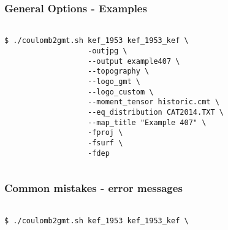 \begin{frame}[t,fragile]
  \frametitle{General Options - Examples}
  \framesubtitle{}
  \label{ch4fr:ex407}
\begin{columns}[t]
  \begin{column}{.5\textwidth}
\begin{scriptsize}
\begin{verbatim}
$ ./coulomb2gmt.sh kef_1953 kef_1953_kef \
                   -outjpg \ 
                   --output example407 \
                   --topography \
                   --logo_gmt \
                   --logo_custom \
                   --moment_tensor historic.cmt \
                   --eq_distribution CAT2014.TXT \
                   --map_title "Example 407" \
                   -fproj \
                   -fsurf \
                   -fdep
\end{verbatim}
\end{scriptsize}

  \end{column}
  \begin{column}{.5\textwidth}

\centering
  \end{column}
\end{columns}

\end{frame}
\note{}

\begin{frame}[t,fragile]
  \frametitle{Common mistakes - error messages}
  \framesubtitle{}
  \label{ch4fr:ex408}
\begin{columns}[t]
  \begin{column}{.5\textwidth}
\begin{scriptsize}
\begin{verbatim}
$ ./coulomb2gmt.sh kef_1953 kef_1953_kef \

\end{verbatim}
\end{scriptsize}

  \end{column}
  \begin{column}{.5\textwidth}

\centering
  \end{column}
\end{columns}

\end{frame}
\note{}






















